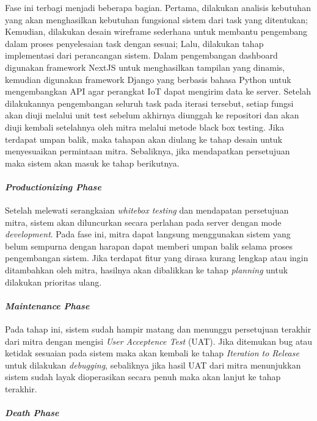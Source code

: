     Fase ini terbagi menjadi beberapa bagian. Pertama, dilakukan analisis kebutuhan yang akan menghasilkan kebutuhan fungsional sistem dari task yang ditentukan; Kemudian, dilakukan desain wireframe sederhana untuk membantu pengembang dalam proses penyelesaian task dengan sesuai; Lalu, dilakukan tahap implementasi dari perancangan sistem. Dalam pengembangan dashboard digunakan framework NextJS untuk menghasilkan tampilan yang dinamis, kemudian digunakan framework Django yang berbasis bahasa Python untuk mengembangkan API agar perangkat IoT dapat mengirim data ke server. Setelah dilakukannya pengembangan seluruh task pada iterasi tersebut, setiap fungsi akan diuji melalui unit test sebelum akhirnya diunggah ke repositori dan akan diuji kembali setelahnya oleh mitra melalui metode black box testing. Jika terdapat umpan balik, maka tahapan akan diulang ke tahap desain untuk menyesuaikan permintaan mitra. Sebaliknya, jika mendapatkan persetujuan maka sistem akan masuk ke tahap berikutnya.

    \paragraph{\textit{Productionizing Phase}}

    Setelah melewati serangkaian \textit{whitebox testing} dan mendapatan persetujuan mitra, sistem akan diluncurkan secara perlahan pada server dengan mode \textit{development}. Pada fase ini, mitra dapat langsung menggunakan sistem yang belum sempurna dengan harapan dapat memberi umpan balik selama proses pengembangan sistem. Jika terdapat fitur yang dirasa kurang lengkap atau ingin ditambahkan oleh mitra, hasilnya akan dibalikkan ke tahap \textit{planning} untuk dilakukan prioritas ulang.

    \paragraph{\textit{Maintenance Phase}}

    Pada tahap ini, sistem sudah hampir matang dan menunggu persetujuan terakhir dari mitra dengan mengisi \textit{User Acceptence Test} (UAT). Jika ditemukan bug atau ketidak sesuaian pada sistem maka akan kembali ke tahap \textit{Iteration to Release} untuk dilakukan \textit{debugging}, sebaliknya jika hasil UAT dari mitra menunjukkan sistem sudah layak dioperasikan secara penuh maka akan lanjut ke tahap terakhir.


    \paragraph{\textit{Death Phase}}

